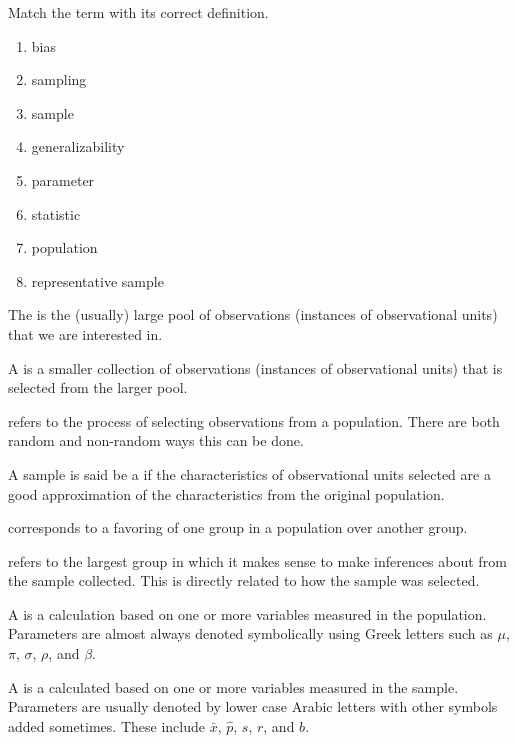 \documentclass[11pt]{exam}
\begin{document}
\noprintanswers   %


\headrule
\footer{}{}{}

\renewcommand{\theenumi}{\Alph{enumi}}

Match the term with its correct definition.

\begin{enumerate}
	\item bias
	\item sampling
	\item sample
	\item generalizability
	\item parameter
	\item statistic
	\item population
	\item representative sample
\end{enumerate}

\begin{questions}

\question The  \fillin is the (usually) large pool of observations (instances of observational units) that we are interested in.

\question A  \fillin  is a smaller collection of observations (instances of observational units) that is selected from the larger pool.

\question  \fillin  refers to the process of selecting observations from a population.  There are both random and non-random ways this can be done.

\question A sample is said be a  \fillin  if the characteristics of observational units selected are a good approximation of the characteristics from the original population.

\question \fillin corresponds to a favoring of one group in a population over another group.

\question \fillin refers to the largest group in which it makes sense to make inferences about from the sample collected.  This is directly related to how the sample was selected.

\question A 
\fillin is a calculation based on one or more variables measured in the population.  Parameters are almost always denoted symbolically using Greek letters such as $\mu$, $\pi$, $\sigma$, $\rho$, and $\beta$.

\question A \fillin is a calculated based on one or more variables measured in the sample.  Parameters are usually denoted by lower case Arabic letters with other symbols added sometimes.  These include $\bar{x}$, $\hat{p}$, $s$, $r$, and $b$. 

\end{questions}
\end{document}
